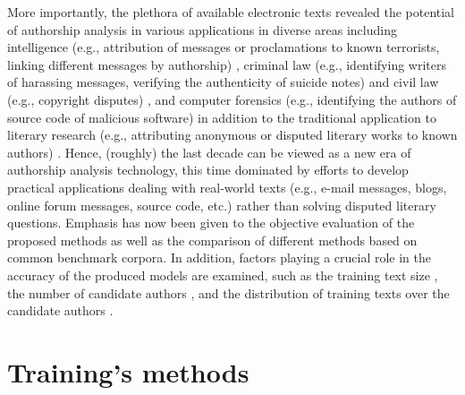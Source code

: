 More importantly, the plethora of available electronic texts revealed the potential of authorship analysis in various applications \cite{madigan2005author} in diverse areas including intelligence (e.g., attribution of messages or proclamations to known terrorists,
linking different messages by authorship) \cite{abbasi2005applying}, criminal law (e.g., identifying writers of harassing messages, verifying the authenticity of suicide notes) and
civil law (e.g., copyright disputes) \cite{chaski2005s}, and computer forensics (e.g., identifying the authors of source code of malicious software) \cite{frantzeskou2006effective} in addition to the traditional application to literary research (e.g., attributing anonymous or disputed literary works to known authors) \cite{burrows2002delta}. Hence, (roughly) the last decade can be viewed as a new era of authorship analysis technology, this time dominated by efforts to develop practical applications dealing with real-world texts (e.g., e-mail messages, blogs,
online forum messages, source code, etc.) rather than solving disputed literary questions. Emphasis has now been given to the objective evaluation of the proposed methods as well
as the comparison of different methods based on common benchmark corpora. In addition, factors playing a crucial role in the accuracy of the produced models are examined, such as the training text size \cite{marton2005compression}, the number
of candidate authors \cite{koppel2006authorship}, and the distribution of training texts over the candidate authors \cite{stamatatos2008author}.

\section{Training's methods}


